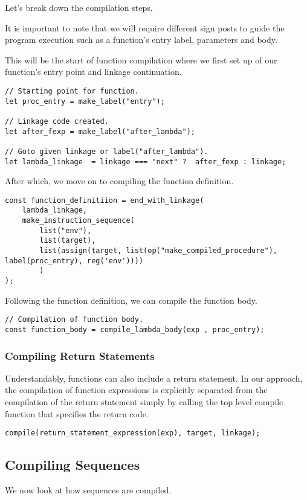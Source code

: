 Let's break down the compilation steps.\newline

It is important to note that we will require different sign posts to guide the program execution such as a function's entry label, parameters and body.

This will be the start of function compilation where we first set up of our function's entry point and linkage continuation.
\begin{lstlisting}[caption=Compile function part I]
// Starting point for function.
let proc_entry = make_label("entry");

// Linkage code created. 
let after_fexp = make_label("after_lambda"); 

// Goto given linkage or label("after_lambda").
let lambda_linkage  = linkage === "next" ?  after_fexp : linkage; 
\end{lstlisting}

After which, we move on to compiling the function definition.
\begin{lstlisting}[caption=Compile function part II]
const function_definitiion = end_with_linkage(
	lambda_linkage,
	make_instruction_sequence(
		list("env"),
		list(target),
		list(assign(target, list(op("make_compiled_procedure"), label(proc_entry), reg('env'))))
		)
);
\end{lstlisting}

Following the function definition, we can compile the function body.
\begin{lstlisting}[caption=Compile function part III]
// Compilation of function body.
const function_body = compile_lambda_body(exp , proc_entry);
\end{lstlisting}


\subsubsection{Compiling Return Statements}
Understandably, functions can also include a return statement. In our approach, the compilation of function expressions is explicitly separated from the compilation of the return statement simply by calling the top level compile function that specifies the return code.

\begin{lstlisting}[caption=Compile Return Statement]
compile(return_statement_expression(exp), target, linkage);
\end{lstlisting}

\subsection{Compiling Sequences}
We now look at how sequences are compiled.\newline

